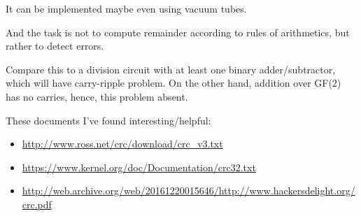 It can be implemented maybe even using vacuum tubes.

And the task is not to compute remainder according to rules of arithmetics, but rather to detect errors.

Compare this to a division circuit with at least one binary adder/subtractor, which will have carry-ripple problem.
On the other hand, addition over GF(2) has no carries, hence, this problem absent.


These documents I've found interesting/helpful:

\begin{itemize}

\item \url{http://www.ross.net/crc/download/crc_v3.txt}
\item \url{https://www.kernel.org/doc/Documentation/crc32.txt}
\item \url{http://web.archive.org/web/20161220015646/http://www.hackersdelight.org/crc.pdf}

\end{itemize}

\levelup{}

